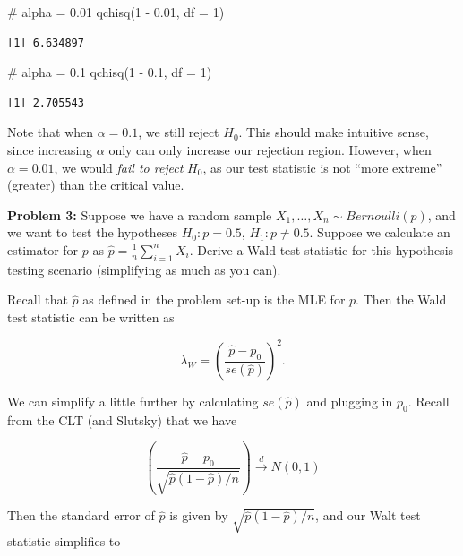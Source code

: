 \documentclass[
  letterpaper,
  DIV=11,
  numbers=noendperiod]{scrreprt}
\newenvironment{Shaded}{\begin{snugshade}}{\end{snugshade}}
\newcommand{\AttributeTok}[1]{\textcolor[rgb]{0.40,0.45,0.13}{#1}}
\newcommand{\CommentTok}[1]{\textcolor[rgb]{0.37,0.37,0.37}{#1}}
\newcommand{\DecValTok}[1]{\textcolor[rgb]{0.68,0.00,0.00}{#1}}
\newcommand{\FloatTok}[1]{\textcolor[rgb]{0.68,0.00,0.00}{#1}}
\newcommand{\FunctionTok}[1]{\textcolor[rgb]{0.28,0.35,0.67}{#1}}
\newcommand{\NormalTok}[1]{\textcolor[rgb]{0.00,0.23,0.31}{#1}}
\newcommand{\SpecialCharTok}[1]{\textcolor[rgb]{0.37,0.37,0.37}{#1}}
\begin{document}
\begin{Shaded}
\begin{Highlighting}[]
\CommentTok{\# alpha = 0.01}
\FunctionTok{qchisq}\NormalTok{(}\DecValTok{1} \SpecialCharTok{{-}} \FloatTok{0.01}\NormalTok{, }\AttributeTok{df =} \DecValTok{1}\NormalTok{)}
\end{Highlighting}
\end{Shaded}

\begin{verbatim}
[1] 6.634897
\end{verbatim}

\begin{Shaded}
\begin{Highlighting}[]
\CommentTok{\# alpha = 0.1}
\FunctionTok{qchisq}\NormalTok{(}\DecValTok{1} \SpecialCharTok{{-}} \FloatTok{0.1}\NormalTok{, }\AttributeTok{df =} \DecValTok{1}\NormalTok{)}
\end{Highlighting}
\end{Shaded}

\begin{verbatim}
[1] 2.705543
\end{verbatim}

Note that when \(\alpha = 0.1\), we still reject \(H_0\). This should
make intuitive sense, since increasing \(\alpha\) only can only increase
our rejection region. However, when \(\alpha = 0.01\), we would
\emph{fail to reject} \(H_0\), as our test statistic is not ``more
extreme'' (greater) than the critical value.

\textbf{Problem 3:} Suppose we have a random sample
\(X_1, \dots, X_n \sim Bernoulli(p)\), and we want to test the
hypotheses \(H_0:p = 0.5\), \(H_1:p \neq 0.5\). Suppose we calculate an
estimator for \(p\) as \(\hat{p} = \frac{1}{n} \sum_{i = 1}^n X_i\).
Derive a Wald test statistic for this hypothesis testing scenario
(simplifying as much as you can).

Recall that \(\hat{p}\) as defined in the problem set-up is the MLE for
\(p\). Then the Wald test statistic can be written as

\[
\lambda_W = \left( \frac{\hat{p} - p_0}{se(\hat{p})}\right)^2.
\]

We can simplify a little further by calculating \(se(\hat{p})\) and
plugging in \(p_0\). Recall from the CLT (and Slutsky) that we have

\[
\left( \frac{\hat{p} - p_0}{\sqrt{\hat{p}(1 - \hat{p})/n}} \right) \overset{d}{\to} N(0,1)
\]

Then the standard error of \(\hat{p}\) is given by
\(\sqrt{\hat{p}(1 - \hat{p})/n}\), and our Walt test statistic
simplifies to
\end{document}
